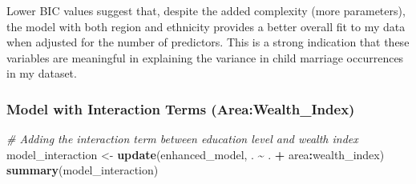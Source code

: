 \documentclass[
]{article}
\newenvironment{Shaded}{\begin{snugshade}}{\end{snugshade}}
\newcommand{\CommentTok}[1]{\textcolor[rgb]{0.56,0.35,0.01}{\textit{#1}}}
\newcommand{\FunctionTok}[1]{\textcolor[rgb]{0.13,0.29,0.53}{\textbf{#1}}}
\newcommand{\NormalTok}[1]{#1}
\newcommand{\OtherTok}[1]{\textcolor[rgb]{0.56,0.35,0.01}{#1}}
\newcommand{\SpecialCharTok}[1]{\textcolor[rgb]{0.81,0.36,0.00}{\textbf{#1}}}
\begin{document}
Lower BIC values suggest that, despite the added complexity (more
parameters), the model with both region and ethnicity provides a better
overall fit to my data when adjusted for the number of predictors. This
is a strong indication that these variables are meaningful in explaining
the variance in child marriage occurrences in my dataset.

\hypertarget{model-with-interaction-terms-areawealth_index}{%
\subsubsection{Model with Interaction Terms
(Area:Wealth\_Index)}\label{model-with-interaction-terms-areawealth_index}}

\begin{Shaded}
\begin{Highlighting}[]
\CommentTok{\# Adding the interaction term between education level and wealth index}
\NormalTok{model\_interaction }\OtherTok{\textless{}{-}} \FunctionTok{update}\NormalTok{(enhanced\_model, . }\SpecialCharTok{\textasciitilde{}}\NormalTok{ . }\SpecialCharTok{+}\NormalTok{ area}\SpecialCharTok{:}\NormalTok{wealth\_index)}
\FunctionTok{summary}\NormalTok{(model\_interaction)}
\end{Highlighting}
\end{Shaded}
\end{document}
